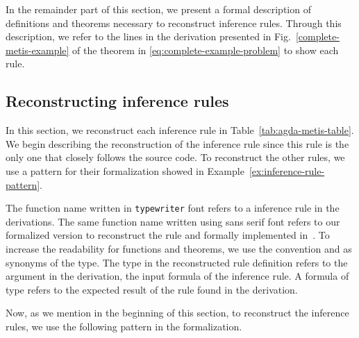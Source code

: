 \documentclass[../main.tex]{subfiles}
\begin{document}
In the remainder part of this section, we present a formal description
of definitions and theorems necessary to reconstruct \Metis inference
rules. Through this description, we refer to the lines in the \Metis
derivation presented in Fig.~\ref{complete-metis-example} of the
theorem in \eqref{eq:complete-example-problem} to show each rule.


\subsection{Reconstructing \Metis inference rules}
\label{ssec:emulating-inferences}

In this section, we reconstruct each \Metis inference rule in
Table~\ref{tab:agda-metis-table}.
We begin describing the reconstruction of the \strip inference rule
since this rule  is the only one that closely follows the \Metis
source code. To reconstruct the other rules, we use a pattern for their
formalization showed in Example~\ref{ex:inference-rule-pattern}.

\begin{notation}
  The function name written in \texttt{typewriter} font refers to a
  \Metis inference rule in the \TSTP derivations. The same function
  name written using
  \textsf{sans serif} font refers to our formalized version to
  reconstruct the rule and formally implemented in~\cite{AgdaMetis}.
  To increase the readability for functions and theorems, we use
  the convention \Source and \Target as synonyms of the \Prop
  type. The \Source type in the reconstructed rule definition refers
  to the argument in the \TSTP derivation, \ie the input formula of
  the inference rule. A formula of \Target type refers to the
  expected result of the rule found in the \TSTP derivation.
\end{notation}



Now, as we mention in the beginning of this section, to reconstruct
the \Metis inference rules, we use the following pattern in
the formalization.
\end{document}
